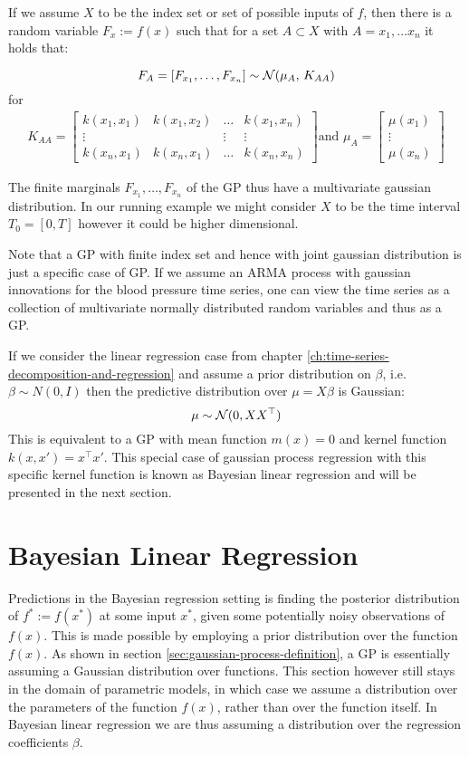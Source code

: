 If we assume $X$ to be the index set or set of possible inputs of $f$, then there is a random variable
$F_x := f(x)$ such that for a set $A \subset X$ with $A={x_1, \dots x_n}$ it holds that:

\[F_A = [F_{x_1}, \dots , F_{x_n}] \sim \operatorname{\mathcal{N}}(\mu_A,\,K_{AA})\]
for
\begin{gather}\label{def:Kernel-Matrix}
    K_{AA} =
    \begin{bmatrix}
        k(x_1, x_1) & k(x_1, x_2) & \dots & k(x_1, x_n)\\
        \vdots  &  & \vdots  & \vdots \\
        k(x_n, x_1)  & k(x_n, x_1) & \dots  & k(x_n, x_n)
    \end{bmatrix} \text{and }
    \mu_A =
    \begin{bmatrix}
        \mu(x_1) \\
        \vdots \\
        \mu(x_n)
    \end{bmatrix}
\end{gather}

The finite marginals $F_{x_1}, \dots, F_{x_n}$ of the GP thus have a multivariate gaussian distribution.
In our running example we might consider $X$ to be the time interval $T_0=[0, T]$ however it could be higher dimensional.

Note that a GP with finite index set and hence with joint gaussian distribution is just a specific case
of GP. If we assume an ARMA process with gaussian innovations for the blood pressure time series, one can view the time series
as a collection of multivariate normally distributed random variables and thus as a GP.


If we consider the linear regression case from chapter \ref{ch:time-series-decomposition-and-regression} and assume a
prior distribution
on $\beta$, i.e. $\beta \sim N(0, I)$ then the predictive distribution over $\mu = X \beta$ is Gaussian:
\[
    \mu \sim \operatorname{\mathcal{N}}(0, XX^{\top})
\]
This is equivalent to a GP with mean function $m(x) = 0$ and kernel function $k(x, x') = x^{\top}x'$.
This special case of gaussian process regression with this specific kernel function is known as Bayesian linear regression
and will be presented in the next section.


\section{Bayesian Linear Regression}\label{subsec:bayesian-linear-regression}
Predictions in the Bayesian regression setting is finding the posterior distribution of
$f^{\ast} := f(x^{\ast})$ at some input $x^{\ast}$, given some potentially noisy observations of $f(x)$.
This is made possible by employing a prior distribution
over the function $f(x)$.
As shown in section \ref{sec:gaussian-process-definition}, a GP is essentially
assuming a Gaussian distribution over functions.
This section however still stays in the domain of parametric models,
in which case we assume a distribution over the parameters of the function $f(x)$,
rather than over the function itself.
In Bayesian linear regression we are thus assuming a distribution over the
regression coefficients $\beta$.

